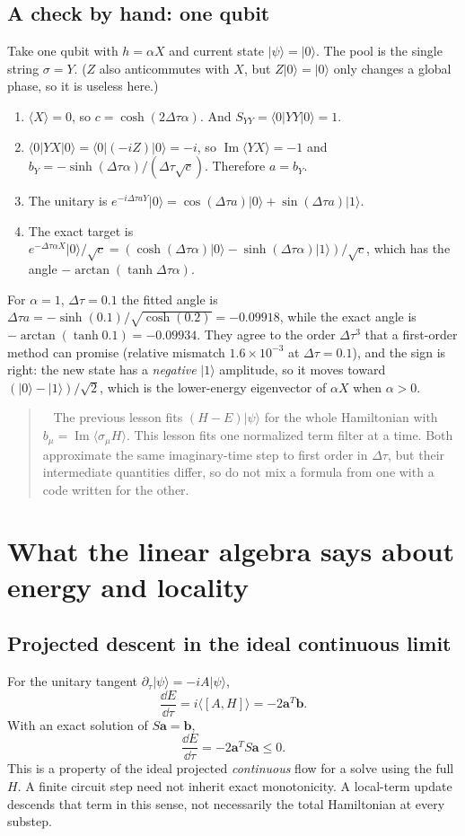 \documentclass[11pt,a4paper]{article}
\newcommand{\ket}[1]{\lvert #1\rangle}
\newcommand{\bra}[1]{\langle #1\rvert}
\newcommand{\ex}[1]{\langle #1\rangle}
\newcommand{\Ima}{\operatorname{Im}}
\newcommand{\dt}{\Delta\tau}
\newcommand{\lesson}[2]{\clearpage\section{#1}\label{#2}}
\newenvironment{caution}[1][Important distinction]{\par\smallskip\begin{quotation}\noindent{\bfseries\textcolor{alertred}{#1.}}\ }{\end{quotation}\smallskip}
\begin{document}
\subsection*{A check by hand: one qubit}
Take one qubit with $h=\alpha X$ and current state $\ket\psi=\ket0$. The pool is the single string $\sigma=Y$. ($Z$ also anticommutes with $X$, but $Z\ket0=\ket0$ only changes a global phase, so it is useless here.)
\begin{enumerate}
\item $\ex{X}=0$, so $c=\cosh(2\dt\alpha)$. And $S_{YY}=\bra0Y Y\ket0=1$.
\item $\bra0 Y X\ket0=\bra0(-iZ)\ket0=-i$, so $\Ima\ex{YX}=-1$ and $b_Y=-\sinh(\dt\alpha)/(\dt\sqrt{c})$. Therefore $a=b_Y$.
\item The unitary is $e^{-i\dt aY}\ket0=\cos(\dt a)\ket0+\sin(\dt a)\ket1$.
\item The exact target is $e^{-\dt\alpha X}\ket0/\sqrt c=(\cosh(\dt\alpha)\ket0-\sinh(\dt\alpha)\ket1)/\sqrt c$, which has the angle $-\arctan(\tanh\dt\alpha)$.
\end{enumerate}
For $\alpha=1$, $\dt=0.1$ the fitted angle is $\dt a=-\sinh(0.1)/\sqrt{\cosh(0.2)}=-0.09918$, while the exact angle is $-\arctan(\tanh 0.1)=-0.09934$. They agree to the order $\dt^3$ that a first-order method can promise (relative mismatch $1.6\times10^{-3}$ at $\dt=0.1$), and the sign is right: the new state has a \emph{negative} $\ket1$ amplitude, so it moves toward $(\ket0-\ket1)/\sqrt2$, which is the lower-energy eigenvector of $\alpha X$ when $\alpha>0$.

\begin{caution}[Two equivalent-looking conventions]
The previous lesson fits $(H-E)\ket\psi$ for the whole Hamiltonian with $b_\mu=\Ima\ex{\sigma_\mu H}$. This lesson fits one normalized term filter at a time. Both approximate the same imaginary-time step to first order in $\dt$, but their intermediate quantities differ, so do not mix a formula from one with a code written for the other.
\end{caution}

\lesson{What the linear algebra says about energy and locality}{sec:matrix}
\subsection*{Projected descent in the ideal continuous limit}
For the unitary tangent $\partial_\tau\ket{\psi}=-iA\ket{\psi}$,
\[
\frac{\dd E}{\dd\tau}=i\ex{[A,H]}=-2\bm a^T\bm b.
\]
With an exact solution of $S\bm a=\bm b$,
\[
\frac{\dd E}{\dd\tau}=-2\bm a^TS\bm a\le0.
\]
This is a property of the ideal projected \emph{continuous} flow for a solve using the full $H$. A finite circuit step need not inherit exact monotonicity. A local-term update descends that term in this sense, not necessarily the total Hamiltonian at every substep.
\end{document}
